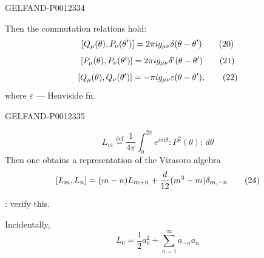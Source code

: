 \begin{GelfandAdjacentEvidence}{GELFAND-P001233}{4}

Then the commutation relations hold:
\begin{equation*}
\relax [Q_\mu(\theta),P_\nu(\theta')]=2\pi i g_{\mu\nu}\delta(\theta-\theta')\tag{20}
\end{equation*}
\begin{equation*}
\relax [P_\mu(\theta),P_\nu(\theta')]=2\pi i g_{\mu\nu}\delta'(\theta-\theta')\tag{21}
\end{equation*}
\begin{equation*}
\relax [Q_\mu(\theta),Q_\nu(\theta')]=-\pi i g_{\mu\nu}\varepsilon(\theta-\theta'),\tag{22}
\end{equation*}
where \(\varepsilon\) --- Heaviside fn.
\end{GelfandAdjacentEvidence}
\begin{GelfandAdjacentEvidence}{GELFAND-P001233}{5}

\begin{equation*}
L_m\overset{\mathrm{def}}{=}\frac1{4\pi}\int_0^{2\pi}
e^{im\theta}:P^2(\theta):\,d\theta\tag{23}
\end{equation*}
Then one obtains a representation of the Virasoro algebra
\begin{equation*}
\relax [L_m,L_n]=(m-n)L_{m+n}+\frac d{12}(m^3-m)\delta_{m,-n}\tag{24}
\end{equation*}
\end{GelfandAdjacentEvidence}


: verify this.

Incidentally,
\begin{equation*}
L_0=\frac12a_0^2+\sum_{n=1}^{\infty}a_{-n}a_n\tag{25}
\end{equation*}


